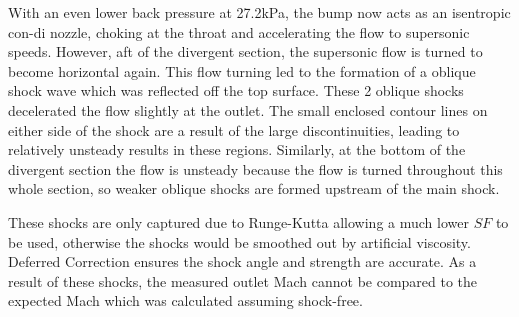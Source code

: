 \documentclass[12pt, a4paper]{article}
\begin{document}
With an even lower back pressure at 27.2kPa, the bump now acts as an isentropic con-di nozzle, choking at the throat and accelerating the flow to supersonic speeds. However, aft of the divergent section, the supersonic flow is turned to become horizontal again. This flow turning led to the formation of a oblique shock wave which was reflected off the top surface. These 2 oblique shocks decelerated the flow slightly at the outlet. The small enclosed contour lines on either side of the shock are a result of the large discontinuities, leading to relatively unsteady results in these regions. Similarly, at the bottom of the divergent section the flow is unsteady because the flow is turned throughout this whole section, so weaker oblique shocks are formed upstream of the main shock.

These shocks are only captured due to Runge-Kutta allowing a much lower $SF$ to be used, otherwise the shocks would be smoothed out by artificial viscosity. Deferred Correction ensures the shock angle and strength are accurate. As a result of these shocks, the measured outlet Mach cannot be compared to the expected Mach which was calculated assuming shock-free.
\end{document}
